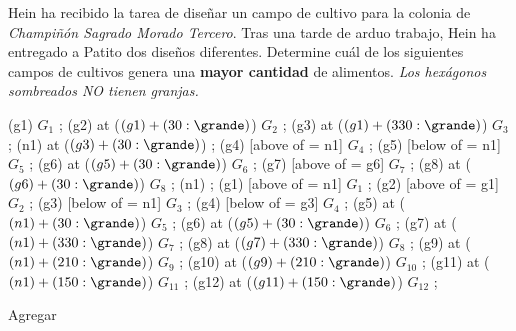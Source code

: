 \begin{probgrupal}{}{}{}

Hein ha recibido la tarea de diseñar un campo de cultivo para la colonia de \emph{Champiñón Sagrado Morado Tercero}. Tras una tarde de %
arduo trabajo, Hein ha entregado a Patito dos diseños diferentes. Determine cuál de los siguientes campos de cultivos genera una \textbf{mayor cantidad} %
de alimentos. \emph{Los hexágonos sombreados NO tienen granjas.}

\begin{center}
\cultivos
\granja (g1) {$G_1$} ;
\granja (g2) at ($(g1) + (30:\grande)$) {$G_2$} ;
\granja (g3) at ($(g1) + (330:\grande)$) {$G_3$} ;
\granjaN (n1) at ($(g3) + (30:\grande)$) {} ;
\granja (g4) [above of = n1] {$G_4$} ;
\granja (g5) [below of = n1] {$G_5$} ;
\granja (g6) at ($(g5) + (30:\grande)$) {$G_6$} ;
\granja (g7) [above of = g6] {$G_7$} ;
\granja (g8) at ($(g6) + (30:\grande)$) {$G_8$} ;
\finfin
\hspace{20mm}
\cultivos
\granjaN (n1) {} ;
\granja (g1) [above of = n1] {$G_1$} ;
\granja (g2) [above of = g1] {$G_2$} ;
\granja (g3) [below of = n1] {$G_3$} ;
\granja (g4) [below of = g3] {$G_4$} ;
\granja (g5) at ($(n1) + (30:\grande)$) {$G_5$} ;
\granja (g6) at ($(g5) + (30:\grande)$) {$G_6$} ;
\granja (g7) at ($(n1) + (330:\grande)$) {$G_7$} ;
\granja (g8) at ($(g7) + (330:\grande)$) {$G_8$} ;
\granja (g9) at ($(n1) + (210:\grande)$) {$G_9$} ;
\granja (g10) at ($(g9) + (210:\grande)$) {$G_{10}$} ;
\granja (g11) at ($(n1) + (150:\grande)$) {$G_{11}$} ;
\granja (g12) at ($(g11) + (150:\grande)$) {$G_{12}$} ;
\finfin
\end{center}


\end{probgrupal}


\begin{solgrupal}
Agregar
\end{solgrupal}



